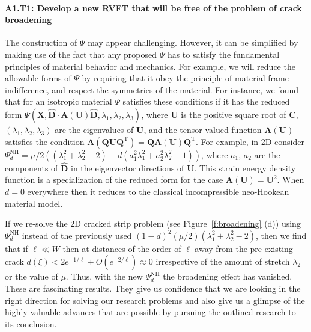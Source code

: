 \documentclass[10pt,letterpaper]{article}
\newcommand{\bs}[1]{\ensuremath{\boldsymbol{#1}}}
\begin{document}
    \paragraph{A1.T1: Develop a  new RVFT that will be free of the problem of crack broadening}
    The construction of $\mathsf{\Psi}$ may appear challenging.  However, it can be simplified by making use of the fact that any proposed $\mathsf{\Psi}$ has to satisfy the fundamental principles of material behavior and mechanics.  For example, we will reduce the allowable forms of $\mathsf{\Psi}$ by requiring that it obey the principle of material frame indifference, and respect the symmetries of the material. For instance, we found that for an isotropic material ${\mathsf{\Psi}}$ satisfies these conditions if it has the reduced form ${\mathsf{\Psi}}(\bs{X}, \hat{\bs{D}}\cdot\mathbf{A}(\bs{U})\hat{\bs{D}}, \lambda_1, \lambda_2,\lambda_3)$, where $\bs{U}$ is the positive square root of $\bs{C}$, $(\lambda_1,\lambda_2,\lambda_3)$ are the eigenvalues of $\bs{U}$, and the tensor valued function $\bs{A}(\bs{U})$ satisfies the condition $
    \bs{A}(\bs{Q}\bs{U}\bs{Q}^{\text{T}})=\bs{Q}\bs{A}(\bs{U})\bs{Q}^{\text{T}}$.  For example, in 2D consider $\mathsf{\Psi}_d^{\text{NH}}=\mu/2((\lambda_1^2+\lambda_2^2-2)-d( a_1^2\lambda_1^2+a_2^2\lambda_2^2-1))$, where $a_1$, $a_2$ are the components of $\hat{\bs{D}}$ in the eigenvector directions of $\bs{U}$.  This strain energy density function is a specialization of the reduced form for the case $\bs{A}(\bs{U})=\bs{U}^2$. When $d=0$ everywhere then it reduces to the classical incompressible neo-Hookean material model.%


    If we re-solve the 2D cracked strip problem (see Figure~\ref{f:broadening} (d)) using $\mathsf{\Psi}_d^{\text{NH}}$ instead of the previously used $(1-d)^2 (\mu/2)(\lambda_1^2+\lambda_2^2-2)$, then we find that if $\ell \ll W$ then at distances of the order of $\ell$ away from the pre-existing crack $d(\xi)<  2e^{-1/\tilde{\ell}}+O(e^{-2/\tilde{\ell}})\approx 0$ irrespective of the amount of stretch $\lambda_2$ or the value of $\mu$. Thus, with the new $\mathsf{\Psi}_d^{\text{NH}}$ the broadening effect has vanished. These are fascinating results. They give us confidence that we are looking in the right direction for solving our research problems and also give us a glimpse of the highly valuable advances that are possible by pursuing the outlined research to its conclusion. %
\end{document}
